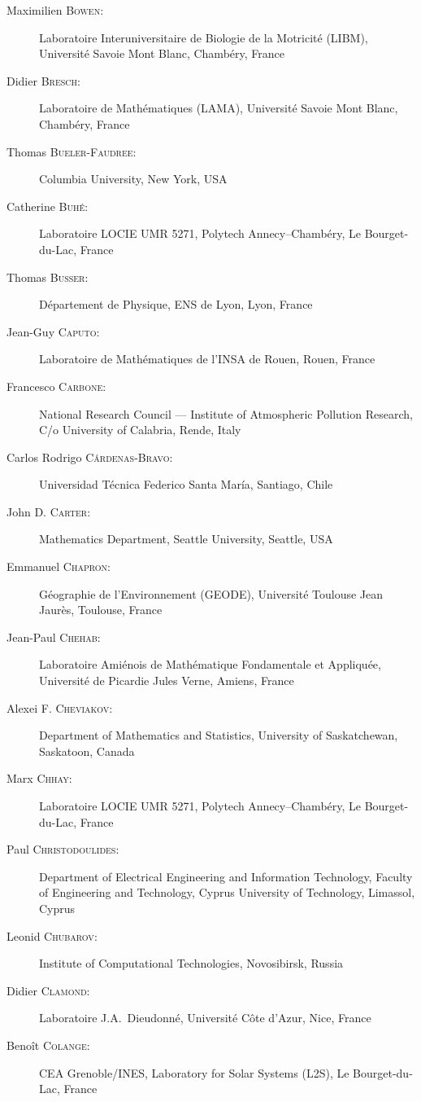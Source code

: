\documentclass[final, a4paper, oneside, 12pt]{article}
\numberwithin{equation}{section}
\begin{document}
\begin{description}
  \item[Maximilien \textsc{Bowen}:] Laboratoire Interuniversitaire de Biologie de la Motricit\'e (LIBM), Universit\'e Savoie Mont Blanc, Chamb\'ery, France
  \item[Didier \textsc{Bresch}:] Laboratoire de Math\'ematiques (LAMA), Universit\'e Savoie Mont Blanc, Chamb\'ery, France
  \item[Thomas \textsc{Bueler-Faudree}:] Columbia University, New York, USA
  \item[Catherine \textsc{Buh\'e}:] Laboratoire LOCIE UMR 5271, Polytech Annecy--Chamb\'ery, Le Bourget-du-Lac, France
  \item[Thomas \textsc{Busser}:] D\'epartement de Physique, ENS de Lyon, Lyon, France
  \item[Jean-Guy \textsc{Caputo}:] Laboratoire de Math\'ematiques de l'INSA de Rouen, Rouen, France
  \item[Francesco \textsc{Carbone}:] National Research Council --- Institute of Atmospheric Pollution Research, C/o University of Calabria, Rende, Italy
  \item[Carlos Rodrigo \textsc{Cárdenas-Bravo}:] Universidad Técnica Federico Santa María, Santiago, Chile
  \item[John D. \textsc{Carter}:] Mathematics Department, Seattle University, Seattle, USA
  \item[Emmanuel \textsc{Chapron}:] G\'eographie de l'Environnement (GEODE), Universit\'e Toulouse Jean Jaur\`es, Toulouse, France
  \item[Jean-Paul \textsc{Chehab}:] Laboratoire Ami\'enois de Math\'ematique Fondamentale et Appliqu\'ee, Universit\'e de Picardie Jules Verne, Amiens, France
  \item[Alexei F. \textsc{Cheviakov}:] Department of Mathematics and Statistics, University of Saskatchewan, Saskatoon, Canada
  \item[Marx \textsc{Chhay}:] Laboratoire LOCIE UMR 5271, Polytech Annecy--Chamb\'ery, Le Bourget-du-Lac, France
  \item[Paul \textsc{Christodoulides}:] Department of Electrical Engineering and Information Technology, Faculty of Engineering and Technology, Cyprus University of Technology, Limassol, Cyprus
  \item[Leonid \textsc{Chubarov}:] Institute of Computational Technologies, Novosibirsk, Russia
  \item[Didier \textsc{Clamond}:] Laboratoire J.A.~Dieudonn\'e, Universit\'e C\^ote d'Azur, Nice, France
  \item[Beno\^it \textsc{Colange}:] CEA Grenoble/INES, Laboratory for Solar Systems (L2S), Le Bourget-du-Lac, France

\end{description}
\end{document}
